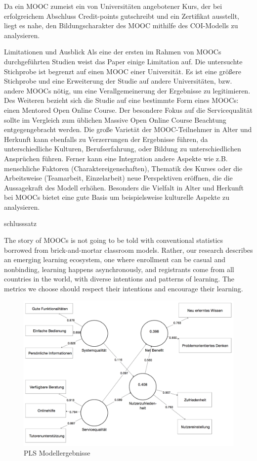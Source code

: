 Da ein MOOC zumeist ein von Universitäten angebotener Kurs, der bei erfolgreichem Abschluss Credit-points gutschreibt und ein Zertifikat ausstellt, liegt es nahe, den Bildungscharakter des MOOC mithilfe des COI-Modells zu analysieren.     

Limitationen und Ausblick
Als eine der ersten im Rahmen von MOOCs durchgeführten Studien weist das Paper einige Limitation auf. Die untersuchte Stichprobe ist begrenzt auf einen MOOC einer Universität. Es ist eine größere Stichprobe und eine Erweiterung der Studie auf andere Universitäten, bzw. andere MOOCs nötig, um eine Verallgemeinerung der Ergebnisse zu legitimieren. Des Weiteren bezieht sich die Studie auf eine bestimmte Form eines MOOCs: einen Mentored Open Online Course. Der besondere Fokus auf die Servicequalität sollte im Vergleich zum üblichen Massive Open Online Course Beachtung entgegengebracht werden. Die große Varietät der MOOC-Teilnehmer in Alter und Herkunft kann ebenfalls zu Verzerrungen der Ergebnisse führen, da unterschiedliche Kulturen, Berufserfahrung, oder Bildung zu unterschiedlichen Ansprüchen führen. 
Ferner kann eine Integration andere Aspekte wie z.B. menschliche Faktoren (Charaktereigenschaften), Thematik des Kurses oder die Arbeitsweise (Teamarbeit, Einzelarbeit) neue Perspektiven eröffnen, die die Aussagekraft des Modell erhöhen. Besonders die Vielfalt in Alter und Herkunft bei MOOCs bietet eine gute Basis um beispielsweise kulturelle Aspekte zu analysieren.  

schlusssatz

 

The story of MOOCs is not going to be told with conventional statistics borrowed from brick-and-mortar classroom models. Rather, our research describes an emerging learning ecosystem, one where enrollment can be casual and nonbinding, learning happens asynchronously, and registrants come from all countries in the world, with diverse intentions and patterns of learning. The metrics we choose should respect their intentions and encourage their learning.\parencite{reich2014tricky}


\begin{figure}[h]
\centering
\includegraphics[width=1\textwidth]{Grafiken/pls_bw_3.png}
\caption{PLS Modellergebnisse}
\label{PLS Modellergebnisse}
\end{figure}